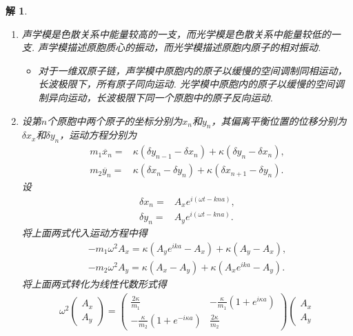 \documentclass[UTF8,10pt,a4paper]{article}
\theoremstyle{Problem}
\theoremstyle{Solution}
\newtheorem*{sol}{解}
\begin{document}
\begin{sol}
    \begin{enumerate}
        \item[(a)] 声学模是色散关系中能量较高的一支，而光学模是色散关系中能量较低的一支. 声学模描述原胞质心的振动，而光学模描述原胞内原子的相对振动.
        \begin{itemize}
            \item[$\triangleright$] 对于一维双原子链，声学模中原胞内的原子以缓慢的空间调制同相运动，长波极限下，所有原子同向运动. 光学模中原胞内的原子以缓慢的空间调制异向运动，长波极限下同一个原胞中的原子反向运动.
        \end{itemize}
        \item[(b)] 设第$n$个原胞中两个原子的坐标分别为$x_n$和$y_n$，其偏离平衡位置的位移分别为$\delta x_x$和$\delta y_n$，运动方程分别为
        \begin{align}
            m_1\ddot{x_n}=&\kappa(\delta y_{n-1}-\delta x_n)+\kappa(\delta y_n-\delta x_n),\\
            m_2\ddot{y_n}=&\kappa(\delta x_n-\delta y_n)+\kappa(\delta x_{n+1}-\delta y_n).
        \end{align}
        设
        \begin{align}
            \delta x_n=&A_xe^{i(\omega t-kna)},\\
            \delta y_n=&A_ye^{i(\omega t-kna)}.
        \end{align}
        将上面两式代入运动方程中得
        \begin{align}
            -m_1\omega^2A_x=\kappa(A_ye^{ika}-A_x)+\kappa(A_y-A_x),\\
            -m_2\omega^2A_y=\kappa(A_x-A_y)+\kappa(A_xe^{ika}-A_y).
        \end{align}
        将上面两式转化为线性代数形式得
        \begin{align}
            \omega^2\left(\begin{matrix}
                A_x\\
                A_y
            \end{matrix}\right)=\left(\begin{matrix}
                \frac{2\kappa}{m_1}&-\frac{\kappa}{m_1}(1+e^{i\kappa a})\\
                -\frac{\kappa}{m_2}(1+e^{-i\kappa a})&\frac{2\kappa}{m_2}
            \end{matrix}\right)\left(\begin{matrix}
                A_x\\
                A_y

\end{matrix}
\end{align}
\end{enumerate}
\end{sol}
\end{document}
